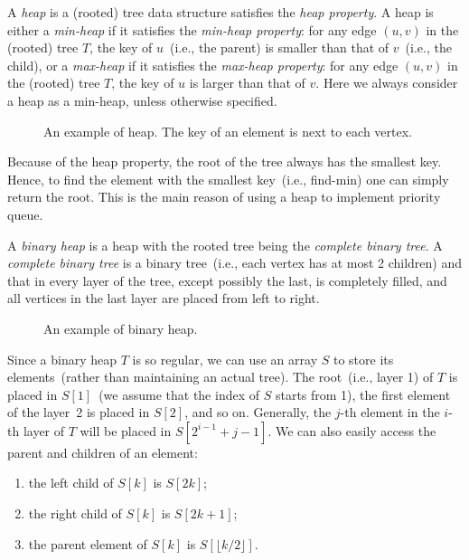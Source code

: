 
A \emph{heap} is a (rooted) tree data structure satisfies the \emph{heap property}.
A heap is either a \emph{min-heap} if it satisfies the \emph{min-heap property}: for any edge $(u, v)$ in the (rooted) tree $T$,
the key of $u$~(i.e., the parent) is smaller than that of $v$~(i.e., the child),
or a \emph{max-heap} if it satisfies the \emph{max-heap property}: for any edge $(u, v)$ in the (rooted) tree $T$,
the key of $u$ is larger than that of $v$.
Here we always consider a heap as a min-heap, unless otherwise specified.

\begin{figure}[h!]
\centering{}
\caption{An example of heap. The key of an element is next to each vertex.}
\end{figure}

Because of the heap property, the root of the tree always has the smallest key.
Hence, to find the element with the smallest key~(i.e., find-min) one can simply
return the root. This is the main reason of using a heap to implement priority queue.

A \emph{binary heap} is a heap with the rooted tree being the \emph{complete binary tree}.
A \emph{complete binary tree} is a binary tree~(i.e., each vertex has at most 2 children)
and that in every layer of the tree, except possibly the last, is completely filled, and all vertices in the last layer are placed from left to right.

\begin{figure}[h!]
\centering{}
\caption{An example of binary heap.}
\end{figure}

Since a binary heap $T$ is so regular, we can use an array $S$ to store its elements~(rather than maintaining an actual tree).
The root~(i.e., layer 1) of $T$ is placed in $S[1]$~(we assume that the index of $S$ starts from 1),
the first element of the layer~2 is placed in $S[2]$, and so on.
Generally, the $j$-th element in the $i$-th layer of $T$ will be placed in $S[2^{i-1} + j - 1]$.
We can also easily access the parent and children of an element:
\begin{enumerate}
\item the left child of $S[k]$ is $S[2k]$; 
\item the right child of $S[k]$ is $S[2k + 1]$;
\item the parent element of $S[k]$ is $S[\lfloor k/2 \rfloor]$.
\end{enumerate}

